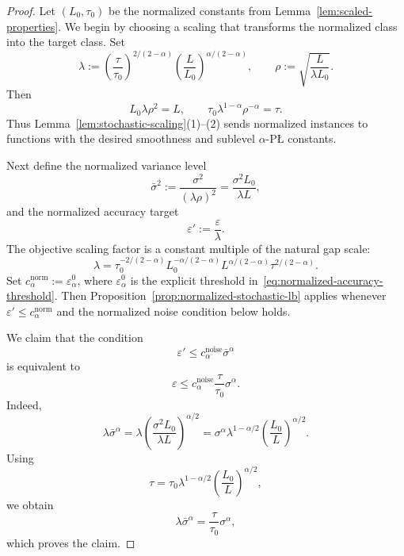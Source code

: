 \documentclass[11pt]{article}
\begin{document}
\begin{proof}
Let $(L_0,\tau_0)$ be the normalized constants from Lemma~\ref{lem:scaled-properties}.
We begin by choosing a scaling that transforms the normalized class into the target class.
Set
\[
\lambda:=\left(\frac{\tau}{\tau_0}\right)^{2/(2-\alpha)}\left(\frac{L}{L_0}\right)^{\alpha/(2-\alpha)},
\qquad
\rho:=\sqrt{\frac{L}{\lambda L_0}}.
\]
Then
\[
L_0\lambda \rho^2=L,
\qquad
\tau_0 \lambda^{1-\alpha}\rho^{-\alpha}=\tau.
\]
Thus Lemma~\ref{lem:stochastic-scaling}(1)--(2) sends normalized instances to functions with the desired smoothness and sublevel $\alpha$-P\L{} constants.

Next define the normalized variance level
\[
\bar \sigma^2:=\frac{\sigma^2}{(\lambda \rho)^2}=\frac{\sigma^2 L_0}{\lambda L},
\]
and the normalized accuracy target
\[
\varepsilon':=\frac{\varepsilon}{\lambda}.
\]
The objective scaling factor is a constant multiple of the natural gap scale:
\[
\lambda
=
\tau_0^{-2/(2-\alpha)}L_0^{-\alpha/(2-\alpha)}
L^{\alpha/(2-\alpha)}\tau^{2/(2-\alpha)}.
\]
Set $c_\alpha^{\mathrm{norm}}:=\varepsilon_\alpha^0$, where
$\varepsilon_\alpha^0$ is the explicit threshold in~\eqref{eq:normalized-accuracy-threshold}. Then
Proposition~\ref{prop:normalized-stochastic-lb} applies whenever
$\varepsilon'\le c_\alpha^{\mathrm{norm}}$ and the normalized noise condition below holds.

We claim that the condition
\[
\varepsilon'\le c_\alpha^{\mathrm{noise}}\bar \sigma^\alpha
\]
is equivalent to
\[
\varepsilon\le c_\alpha^{\mathrm{noise}}\frac{\tau}{\tau_0}\sigma^\alpha.
\]
Indeed,
\[
\lambda \bar \sigma^\alpha
=
\lambda \left(\frac{\sigma^2 L_0}{\lambda L}\right)^{\alpha/2}
=
\sigma^\alpha \lambda^{1-\alpha/2}\left(\frac{L_0}{L}\right)^{\alpha/2}.
\]
Using
\[
\tau=\tau_0\lambda^{1-\alpha/2}\left(\frac{L_0}{L}\right)^{\alpha/2},
\]
we obtain
\[
\lambda \bar \sigma^\alpha=\frac{\tau}{\tau_0}\sigma^\alpha,
\]
which proves the claim.


\end{proof}
\end{document}
